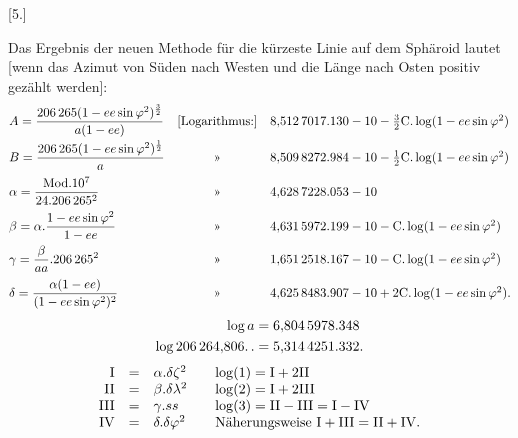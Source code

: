 \clearpage
\noindent\makebox[12mm][l]{}\par\medskip
\begin{center}[5.]\end{center}
Das Ergebnis der neuen Methode für die kürzeste Linie auf dem Sphäroid
lautet [wenn das Azimut von Süden nach Westen und die Länge nach Osten positiv gezählt werden]:
\begingroup\small
\[
\begin{array}{@{}lcl@{}}
\displaystyle A=\frac{206\,265(1-ee\sin\varphi^2)^{\frac32}}{a(1-ee)}
&\text{[Logarithmus:]}&8{,}512\,7017.130-10-\tfrac32\mathrm{C}.\log(1-ee\sin\varphi^2)\\[2ex]
\displaystyle B=\frac{206\,265(1-ee\sin\varphi^2)^{\frac12}}a
&\text{»}&8{,}509\,8272.984-10-\tfrac12\mathrm{C}.\log(1-ee\sin\varphi^2)\\[2ex]
\displaystyle\alpha=\frac{\mathrm{Mod}.10^7}{24.206\,265^2}
&\text{»}&4{,}628\,7228.053-10\\[2ex]
\displaystyle\beta=\alpha.\frac{1-ee\sin\varphi^2}{1-ee}
&\text{»}&4{,}631\,5972.199-10-\mathrm{C}.\log(1-ee\sin\varphi^2)\\[2ex]
\displaystyle\gamma=\frac\beta{aa}.206\,265^2
&\text{»}&1{,}651\,2518.167-10-\mathrm{C}.\log(1-ee\sin\varphi^2)\\[2ex]
\displaystyle\delta=\frac{\alpha(1-ee)}{(1-ee\sin\varphi^2)^2}
&\text{»}&4{,}625\,8483.907-10+2\mathrm{C}.\log(1-ee\sin\varphi^2).
\end{array}
\]
\endgroup
{}
\[
\begin{aligned}
\log a&=6{,}804\,5978.348\\
\log206\,264{,}806\ldotp\ldotp&=5{,}314\,4251.332.
\end{aligned}
\]
\[
\begin{array}{rcl@{\qquad}l}
\mathrm I&=&\alpha.\delta\zeta^2&\log(1)=\mathrm I+2\mathrm{II}\\
\mathrm{II}&=&\beta.\delta\lambda^2&\log(2)=\mathrm I+2\mathrm{III}\\
\mathrm{III}&=&\gamma.ss&\log(3)=\mathrm{II}-\mathrm{III}=\mathrm I-\mathrm{IV}\\
\mathrm{IV}&=&\delta.\delta\varphi^2&\text{Näherungsweise }\mathrm I+\mathrm{III}=\mathrm{II}+\mathrm{IV}.
\end{array}
\]

